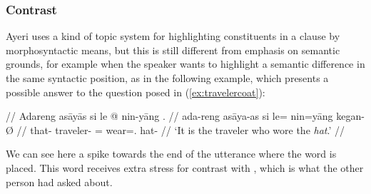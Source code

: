 
\subsubsection{Contrast}

Ayeri uses a kind of topic system for
highlighting constituents in a clause by morphosyntactic means, but this is
still different from emphasis on semantic grounds, for example when the speaker
wants to highlight a semantic difference in the same syntactic position, as in
the following example, which presents a possible answer to the question posed
in (\ref{ex:travelercoat}):

\ex\begingl
	\glpreamble{} //
	\gla Adareng asāyās si le @ nin-yāng . //
	\glb ada-reng asāya-as si le= nin=yāng kegan-Ø //
	\glc that-\AargI{} traveler-\Parg{} \Rel{} \PatTI{}= wear=\TsgM{}.\Aarg{} 
		hat-\Top{} //
	\glft `It is the traveler who wore the \emph{hat}.' //
\endgl\xe

We can see here a spike towards the end of the utterance where the word 
 is placed. This word receives extra stress for 
contrast with , which is what the other person had asked 
about.

